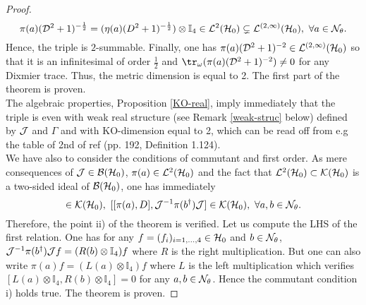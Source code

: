 \documentclass[a4paper]{jpconf}
\numberwithin{equation}{section}
\newcommand\bbone{{ \mathbb{I}}}
\theoremstyle{nonumberplain}
\newtheorem{proof}{Proof}
\begin{document}
\begin{proof}
\begin{equation}
\pi(a)({\cal{D}}^2+1)^{-\frac{1}{2}}=(\eta(a)(D^2+1)^{-\frac{1}{2}})\otimes\bbone_4\in{\cal{L}}^2({\cal{H}}_0)\subsetneq{\cal{L}}^{(2,\infty)}({\cal{H}}_0),\ \forall a\in{\cal{N}}_\theta.
\end{equation}
Hence, the triple is $2$-summable. Finally, one has $\pi(a)({\cal{D}}^2+1)^{-2}\in{\cal{L}}^{(2,\infty)}({\cal{H}}_0)$ so that it is an infinitesimal of order $\frac{1}{2}$ and $\tr_\omega(\pi(a)({\cal{D}}^2+1)^{-2})\ne0$ for any Dixmier trace. Thus, the metric dimension is equal to 2. The first part of the theorem is proven.\\
The algebraic properties, Proposition \ref{KO-real}, imply immediately that the triple is even with weak real structure (see Remark \ref{weak-struc} below) defined by ${\cal{J}}$ and $\Gamma$ and with KO-dimension equal to 2, which can be read off from e.g the table of 2nd of ref \cite{Connes1} (pp. 192, Definition 1.124).\\
We have also to consider the conditions of commutant and first order. As mere consequences of ${\cal{J}}\in{\cal{B}}({\cal{H}}_0)$, $\pi(a)\in{\cal{L}}^2({\cal{H}}_0)$ and the fact that ${\cal{L}}^2({\cal{H}}_0)\subset{\cal{K}}({\cal{H}}_0)$ is a two-sided ideal of ${\cal{B}}({\cal{H}}_0)$, one has immediately
\begin{equation}
[\pi(a),{\cal{J}}^{-1}\pi(b^\dag){\cal{J}}]\in{\cal{K}}({\cal{H}}_0),\ [[\pi(a),D],{\cal{J}}^{-1}\pi(b^\dag){\cal{J}}]\in{\cal{K}}({\cal{H}}_0),\ \forall 
a,b\in{\cal{N}}_\theta.
\end{equation}
Therefore, the point ii) of the theorem is verified. Let us compute the LHS of the first relation. One has for any $f=(f_i)_{i=1,...,4}\in{\cal{H}}_0$ and $b\in{\cal{N}}_\theta$,  ${\cal{J}}^{-1}\pi(b^\dag){\cal{J}}f=(R(b)\otimes\bbone_4)f$ where $R$ is the right multiplication. But one can also write $\pi(a) f=(L(a)\otimes\bbone_4)f$ where $L$ is the left multiplication which verifies $[L(a)\otimes\bbone_4,R(b)\otimes\bbone_4]=0$ for any $a,b\in{\cal{N}}_\theta$. Hence the commutant condition i) holds true. The theorem is proven.
\end{proof}
\end{document}
